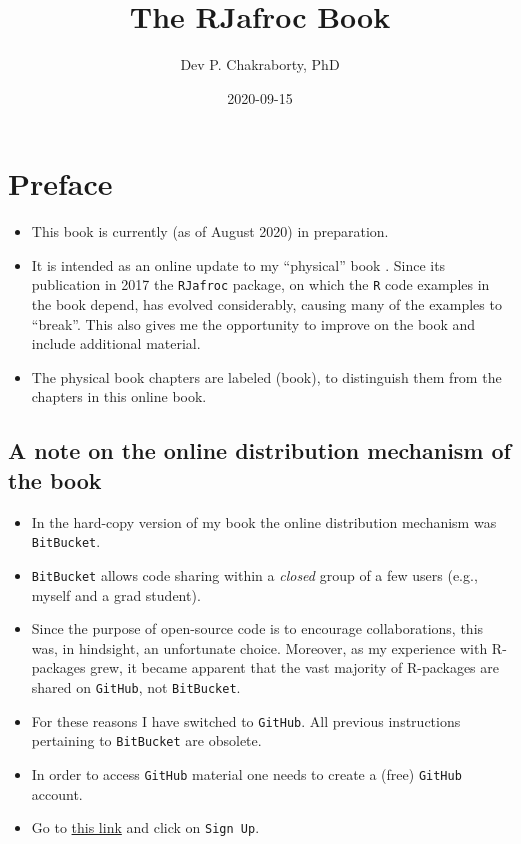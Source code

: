 \documentclass[
]{book}
\title{The RJafroc Book}
\author{Dev P. Chakraborty, PhD}
\date{2020-09-15}
\providecommand{\tightlist}{%
  \setlength{\itemsep}{0pt}\setlength{\parskip}{0pt}}
\begin{document}
\maketitle

{
\setcounter{tocdepth}{1}
\tableofcontents
}
\hypertarget{preface}{%
\chapter*{Preface}\label{preface}}

\begin{itemize}
\tightlist
\item
  This book is currently (as of August 2020) in preparation.
\item
  It is intended as an online update to my ``physical'' book \citep{RN2680}. Since its publication in 2017 the \texttt{RJafroc} package, on which the \texttt{R} code examples in the book depend, has evolved considerably, causing many of the examples to ``break''. This also gives me the opportunity to improve on the book and include additional material.
\item
  The physical book chapters are labeled (book), to distinguish them from the chapters in this online book.
\end{itemize}

\hypertarget{a-note-on-the-online-distribution-mechanism-of-the-book}{%
\section*{A note on the online distribution mechanism of the book}\label{a-note-on-the-online-distribution-mechanism-of-the-book}}

\begin{itemize}
\tightlist
\item
  In the hard-copy version of my book \citep{RN2680} the online distribution mechanism was \texttt{BitBucket}.
\item
  \texttt{BitBucket} allows code sharing within a \emph{closed} group of a few users (e.g., myself and a grad student).
\item
  Since the purpose of open-source code is to encourage collaborations, this was, in hindsight, an unfortunate choice. Moreover, as my experience with R-packages grew, it became apparent that the vast majority of R-packages are shared on \texttt{GitHub}, not \texttt{BitBucket}.
\item
  For these reasons I have switched to \texttt{GitHub}. All previous instructions pertaining to \texttt{BitBucket} are obsolete.
\item
  In order to access \texttt{GitHub} material one needs to create a (free) \texttt{GitHub} account.
\item
  Go to \href{https://github.com}{this link} and click on \texttt{Sign\ Up}.
\end{itemize}
\end{document}
